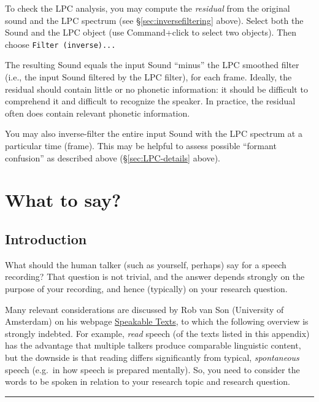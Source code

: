 \documentclass[
]{book}
\begin{document}
To check the LPC analysis, you may compute the \emph{residual} from the original sound and the LPC spectrum (see §\ref{sec:inversefiltering} above).
Select both the Sound and the LPC object (use Command+click to select two objects).
Then choose \texttt{Filter\ (inverse)...}

The resulting Sound equals the input Sound ``minus'' the LPC smoothed filter (i.e., the input Sound filtered by the LPC filter), for each frame.
Ideally, the residual should contain little or no phonetic information: it should be difficult to comprehend it and difficult to recognize the speaker.
In practice, the residual often does contain relevant phonetic information.

You may also inverse-filter the entire input Sound with the LPC spectrum at a particular time (frame). This may be helpful to assess possible ``formant confusion'' as described above (§\ref{sec:LPC-details} above).

\appendix


\chapter{What to say?}\label{app-saywhat}

\section{Introduction}\label{introduction-2}

What should the human talker (such as yourself, perhaps) say for a speech recording? That question is not trivial, and the answer depends strongly on the purpose of your recording, and hence (typically) on your research question.

Many relevant considerations are discussed by Rob van Son (University of Amsterdam) on his webpage \href{https://www.fon.hum.uva.nl/rob/SpeakableTexts.html}{Speakable Texts}, to which the following overview is strongly indebted.
For example, \emph{read} speech (of the texts listed in this appendix) has the advantage that multiple talkers produce comparable linguistic content, but the downside is that reading differs significantly from typical, \emph{spontaneous} speech (e.g.~in how speech is prepared mentally). So, you need to consider the words to be spoken in relation to your research topic and research question.

\begin{center}\rule{0.5\linewidth}{0.5pt}\end{center}
\end{document}
